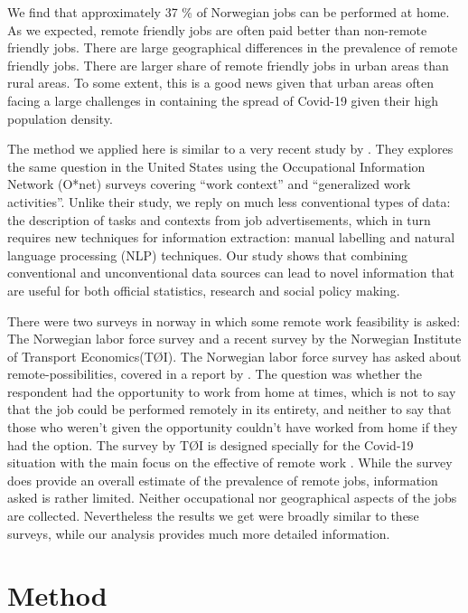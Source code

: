 \documentclass[11pt,]{article}
\begin{document}
We find that approximately 37 \% of Norwegian jobs can be performed at
home. As we expected, remote friendly jobs are often paid better than
non-remote friendly jobs. There are large geographical differences in
the prevalence of remote friendly jobs. There are larger share of remote
friendly jobs in urban areas than rural areas. To some extent, this is a
good news given that urban areas often facing a large challenges in
containing the spread of Covid-19 given their high population density.

The method we applied here is similar to a very recent study by
\citep{Dingel2020}. They explores the same question in the United States
using the Occupational Information Network (O*net) surveys covering
``work context'' and ``generalized work activities''. Unlike their
study, we reply on much less conventional types of data: the description
of tasks and contexts from job advertisements, which in turn requires
new techniques for information extraction: manual labelling and natural
language processing (NLP) techniques. Our study shows that combining
conventional and unconventional data sources can lead to novel
information that are useful for both official statistics, research and
social policy making.

There were two surveys in norway in which some remote work feasibility
is asked: The Norwegian labor force survey and a recent survey by the
Norwegian Institute of Transport Economics(TØI). The Norwegian labor
force survey has asked about remote-possibilities, covered in a report
by \citep{Nergaard2018}. The question was whether the respondent had the
opportunity to work from home at times, which is not to say that the job
could be performed remotely in its entirety, and neither to say that
those who weren't given the opportunity couldn't have worked from home
if they had the option. The survey by TØI is designed specially for the
Covid-19 situation with the main focus on the effective of remote work
\citep{Nordbakke2020}. While the survey does provide an overall estimate
of the prevalence of remote jobs, information asked is rather limited.
Neither occupational nor geographical aspects of the jobs are collected.
Nevertheless the results we get were broadly similar to these surveys,
while our analysis provides much more detailed information.

\hypertarget{method}{%
\section{Method}\label{method}}
\end{document}
